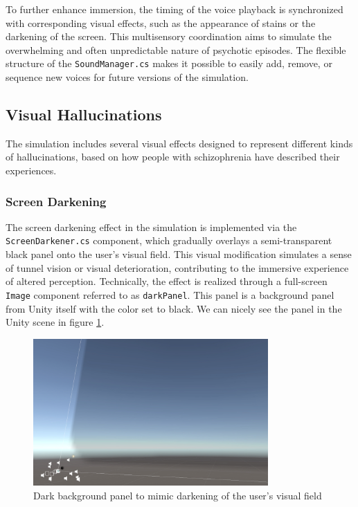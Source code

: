 \vspace{1em}
To further enhance immersion, the timing of the voice playback is synchronized with corresponding visual effects, such as the appearance of stains or the darkening of the screen. This multisensory coordination aims to simulate the overwhelming and often unpredictable nature of psychotic episodes. The flexible structure of the \texttt{SoundManager.cs} makes it possible to easily add, remove, or sequence new voices for future versions of the simulation.

\subsection{Visual Hallucinations}

The simulation includes several visual effects designed to represent different kinds of hallucinations, based on how people with schizophrenia have described their experiences. 

\subsubsection{Screen Darkening}

The screen darkening effect in the simulation is implemented via the \texttt{ScreenDarkener.cs} component, which gradually overlays a semi-transparent black panel onto the user's visual field. This visual modification simulates a sense of tunnel vision or visual deterioration, contributing to the immersive experience of altered perception. Technically, the effect is realized through a full-screen \texttt{Image} component referred to as \texttt{darkPanel}. This panel is a background panel from Unity itself with the color set to black. We can nicely see the panel in the Unity scene in figure \ref{fig:darkpanel}. 

\begin{figure}[h!] 
    \centering 
    \includegraphics[width=0.8\textwidth]{../../Figures/darkpanel.jpg} 
    \caption{Dark background panel to mimic darkening of the user's visual field} 
    \label{fig:darkpanel} 
\end{figure}

